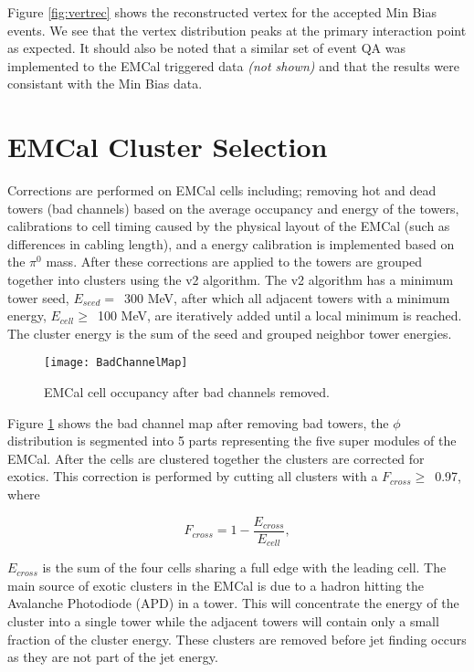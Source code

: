\noindent 
Figure \ref{fig:vertrec} shows the reconstructed vertex for the accepted Min Bias events.  We see that the vertex distribution peaks at the primary interaction point as expected.  It should also be noted that a similar set of event QA was implemented to the EMCal triggered data \textit{(not shown)} and that the results were consistant with the Min Bias data.

\section{EMCal Cluster Selection}
Corrections are performed on EMCal cells including; removing hot and dead towers (bad channels) based on the average occupancy and energy of the towers, calibrations to cell timing caused by the physical layout of the EMCal (such as differences in cabling length), and a energy calibration is implemented based on the $\pi^{0}$ mass.  After these corrections are applied to the towers are grouped together into clusters using the v2 algorithm.  The v2 algorithm has a minimum tower seed, $E_{seed} = \,$ 300 MeV, after which all adjacent towers with a minimum energy, $E_{cell} \geq \,$ 100 MeV, are iteratively added until a local minimum is reached.  The cluster energy is the sum of the seed and grouped neighbor tower energies.   

\begin{figure}[h]
\texttt{[image: BadChannelMap]}
\centering
\caption{EMCal cell occupancy after bad channels removed.}
\label{fig:badchannel}
\end{figure}


\noindent
Figure \ref{fig:badchannel} shows the bad channel map after removing bad towers, the $\phi$ distribution is segmented into 5 parts representing the five super modules of the EMCal.  After the cells are clustered together the clusters are corrected for exotics.  This correction is performed by cutting all clusters with a $F_{cross} \geq \,$ 0.97, where

\begin{equation}
F_{cross} = 1 - \frac{ E_{cross} }{ E_{cell} },
\label{eq:Fcross}
\end{equation}

\noindent
$E_{cross}$ is the sum of the four cells sharing a full edge with the leading cell.  The main source of exotic clusters in the EMCal is due to a hadron hitting the Avalanche Photodiode (APD) in a tower.  This will concentrate the energy of the cluster into a single tower while the adjacent towers will contain only a small fraction of the cluster energy.  These clusters are removed before jet finding occurs as they are not part of the jet energy.

